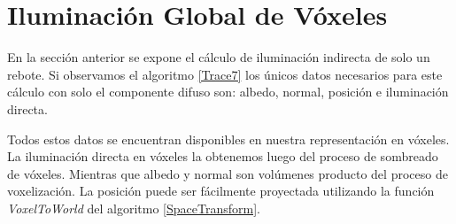 \section{Iluminación Global de Vóxeles} %
\label{sec:iluminacion_global_de_voxeles_impl}
En la sección anterior se expone el cálculo de iluminación indirecta de solo un rebote. Si observamos el algoritmo \ref{Trace7} los únicos datos necesarios para este cálculo con solo el componente difuso son: albedo, normal, posición e iluminación directa.

Todos estos datos se encuentran disponibles en nuestra representación en vóxeles. La iluminación directa en vóxeles la obtenemos luego del proceso de sombreado de vóxeles. Mientras que albedo y normal son volúmenes producto del proceso de voxelización. La posición puede ser fácilmente proyectada utilizando la función \emph{VoxelToWorld} del algoritmo \ref{SpaceTransform}.


